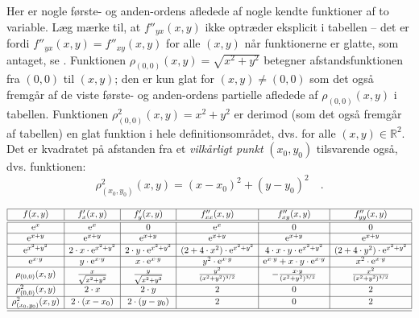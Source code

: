 \begin{example} \label{exampDiffn}
Her er nogle første- og anden-ordens afledede af nogle kendte  funktioner af to variable. Læg mærke til, at $f''_{yx}(x,y)$ ikke optræder eksplicit i tabellen -- det er fordi $f''_{yx}(x,y)= f''_{xy}(x,y)$ for alle $(x,y)$ når funktionerne er glatte, som antaget, se . Funktionen $\rho_{(0,0)}(x,y) = \sqrt{x^{2} + y^{2}}$ betegner afstandsfunktionen fra $(0,0)$ til $(x,y)$; den er kun glat for $(x,y) \neq (0,0)$ som det også fremgår af de viste første- og anden-ordens partielle afledede af $\rho_{(0, 0)}(x,y)$ i tabellen. Funktionen $\rho_{(0,0)}^{2}(x,y) = x^{2} + y^{2}$ er derimod (som det også fremgår af tabellen) en glat funktion i hele definitionsområdet, dvs. for alle $(x,y) \in \mathbb{R}^{2}$. Det er kvadratet på afstanden fra et {\textit{vilkårligt punkt}} $(x_{0}, y_{0})$ tilsvarende også, dvs. funktionen: $$\rho_{(x_{0}, y_{0})}^{2}(x,y) = (x-x_{0})^{2} + (y-y_{0})^{2}\quad .$$

\begin{footnotesize}
\begin{equation*} \label{eqTabelHighOrderDeriv}
\begin{array}{|c|c|c|c|c|c|}
  \hline
  f(x,y) & f'_{x}(x,y) & f'_{y}(x,y) & f''_{xx}(x,y) & f''_{xy}(x,y) & f''_{yy}(x,y) \\ \hline \hline
    \mathrm{e}^{x} &  \mathrm{e}^{x} &  0&  \mathrm{e}^{x}& 0 &  0 \\ \hline
  \mathrm{e}^{x+y} &  \mathrm{e}^{x+y} &  \mathrm{e}^{x+y}&  \mathrm{e}^{x+y}& \mathrm{e}^{x+y} &  \mathrm{e}^{x+y} \\ \hline
   \mathrm{e}^{x^{2} + y^{2}} & 2\cdot x \cdot \mathrm{e}^{x^{2} + y^{2}} &   2\cdot y \cdot \mathrm{e}^{x^{2} + y^{2}}&  (2 + 4\cdot x^{2})\cdot\mathrm{e}^{x^{2} + y^{2}} & 4\cdot x \cdot y \cdot \mathrm{e}^{x^{2} + y^{2}}  &  (2+ 4\cdot y^{2})\cdot\mathrm{e}^{x^{2} + y^{2}}\\ \hline
   \mathrm{e}^{x\cdot y} & y\cdot\mathrm{e}^{x\cdot y} & x\cdot\mathrm{e}^{x\cdot y} & y^{2}\cdot \mathrm{e}^{x\cdot y}& \mathrm{e}^{x\cdot y}  +x \cdot y\cdot \mathrm{e}^{x\cdot y} &  x^{2}\cdot \mathrm{e}^{x\cdot y}\\ \hline
      \rho_{(0,0)}(x,y) & \frac{x}{\sqrt{x^{2} + y^{2}}} &  \frac{y}{\sqrt{x^{2} + y^{2}}} & \frac{y^{2}}{(x^{2} + y^{2})^{3/2}}  & -\frac{x\cdot y}{(x^{2} + y^{2})^{3/2}}   &   \frac{x^{2}}{(x^{2} + y^{2})^{3/2}}   \\ \hline
        \rho_{(0,0)}^{2}(x,y) & 2\cdot x &  2\cdot y & 2& 0& 2  \\ \hline
       \rho_{(x_{0}, y_{0})}^{2}(x,y)& 2\cdot (x-x_{0}) &  2\cdot (y-y_{0}) & 2 & 0& 2  \\ \hline \hline
\end{array}
\end{equation*}
\end{footnotesize}

\end{example}

